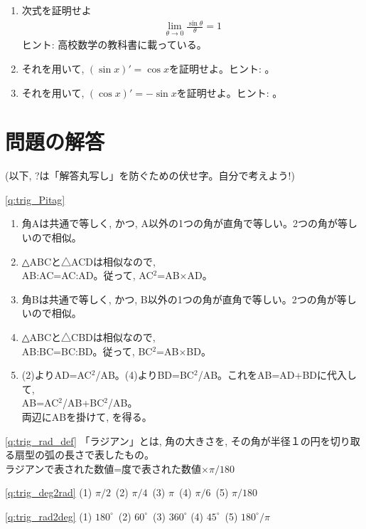 \begin{exq}\label{q:trig_sin_approx} 
\begin{enumerate}
\item 次式を証明せよ
\begin{eqnarray}
\lim_{\theta\rightarrow0}\frac{\sin \theta}{\theta}=1
\end{eqnarray}
ヒント: 高校数学の教科書に載っている。
\item それを用いて, $(\sin x)'=\cos x$を証明せよ。ヒント: 。
\item それを用いて, $(\cos x)'=-\sin x$を証明せよ。ヒント: 。
\end{enumerate}
\end{exq}
\hv

\section*{問題の解答}
(以下, ?は「解答丸写し」を防ぐための伏せ字。自分で考えよう!) 

\ref{q:trig_Pitag}\
\begin{enumerate}
\item 角Aは共通で等しく, かつ, A以外の1つの角が直角で等しい。2つの角が等しいので相似。
\item △ABCと△ACDは相似なので, \\AB:AC=AC:AD。従って, AC$^2$=AB$\times$AD。
\item 角Bは共通で等しく, かつ, B以外の1つの角が直角で等しい。2つの角が等しいので相似。
\item △ABCと△CBDは相似なので, \\AB:BC=BC:BD。従って, BC$^2$=AB$\times$BD。
\item (2)よりAD=AC$^2$/AB。(4)よりBD=BC$^2$/AB。これをAB=AD+BDに代入して, \\
AB=AC$^2$/AB+BC$^2$/AB。\\両辺にABを掛けて, を得る。
\end{enumerate}
\mv

\ref{q:trig_rad_def} 
「ラジアン」とは, 角の大きさを, その角が半径１の円を切り取る扇型の弧の長さで表したもの。\\
ラジアンで表された数値=度で表された数値$\times \pi/180$
\mv

\ref{q:trig_deg2rad} 
(1) $\pi/2\,$ (2) $\pi/4\,$ (3) $\pi\,$ (4) $\pi/6\,$ (5) $\pi/180$
\mv

\ref{q:trig_rad2deg} 
(1) $180^{\circ}\,$ (2) $60^{\circ}\,$ (3) $360^{\circ}$ (4) $45^{\circ}\,$ (5) $180^{\circ}/\pi$
\mv

